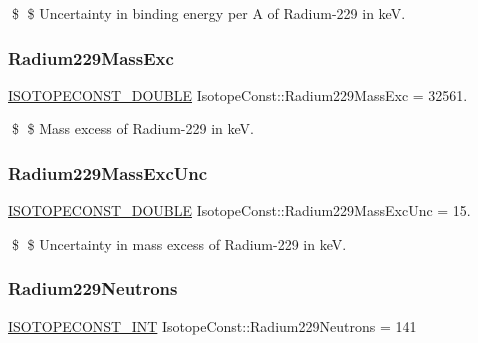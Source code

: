 \$ \$ Uncertainty in binding energy per A of Radium-\/229 in keV. \mbox{\label{group___isotope_const-_radium-_ra229_gaa78b4cd9894beb61564ef52008b0f259}} 
\subsubsection{\texorpdfstring{Radium229\+Mass\+Exc}{Radium229MassExc}}
{\footnotesize\ttfamily \mbox{\hyperlink{group___isotope_const-_macros_ga8f45a7272ce02c0b4c65c44636ed719a}{I\+S\+O\+T\+O\+P\+E\+C\+O\+N\+S\+T\+\_\+\+D\+O\+U\+B\+LE}} Isotope\+Const\+::\+Radium229\+Mass\+Exc = 32561.}

\$ \$ Mass excess of Radium-\/229 in keV. \mbox{\label{group___isotope_const-_radium-_ra229_gaa420d27228d81ab71e3b0b85c2cd563d}} 
\subsubsection{\texorpdfstring{Radium229\+Mass\+Exc\+Unc}{Radium229MassExcUnc}}
{\footnotesize\ttfamily \mbox{\hyperlink{group___isotope_const-_macros_ga8f45a7272ce02c0b4c65c44636ed719a}{I\+S\+O\+T\+O\+P\+E\+C\+O\+N\+S\+T\+\_\+\+D\+O\+U\+B\+LE}} Isotope\+Const\+::\+Radium229\+Mass\+Exc\+Unc = 15.}

\$ \$ Uncertainty in mass excess of Radium-\/229 in keV. \mbox{\label{group___isotope_const-_radium-_ra229_ga1deb2f9bf1127aaefbe99d9f4d830a82}} 
\subsubsection{\texorpdfstring{Radium229\+Neutrons}{Radium229Neutrons}}
{\footnotesize\ttfamily \mbox{\hyperlink{group___isotope_const-_macros_ga5f18360b3e99483a35c32d789e62621c}{I\+S\+O\+T\+O\+P\+E\+C\+O\+N\+S\+T\+\_\+\+I\+NT}} Isotope\+Const\+::\+Radium229\+Neutrons = 141}

